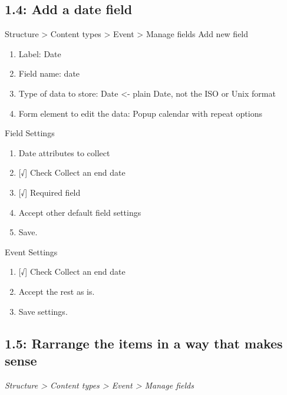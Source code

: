 \documentclass[letterpaper,10pt,english]{sphinxmanual}
\begin{document}
\subsection{1.4: Add a date field}
\label{event_calendar:add-a-date-field}
Structure \textgreater{} Content types \textgreater{} Event \textgreater{} Manage fields
Add new field
\begin{enumerate}
\item {} 
Label: Date

\item {} 
Field name: date

\item {} 
Type of data to store: Date \textless{}- plain Date, not the ISO or Unix format

\item {} 
Form element to edit the data: Popup calendar with repeat options

\end{enumerate}

Field Settings
\begin{enumerate}
\item {} 
Date attributes to collect

\item {} 
{[}√{]} Check Collect an end date

\item {} 
{[}√{]} Required field

\item {} 
Accept other default field settings

\item {} 
Save.

\end{enumerate}

Event Settings
\begin{enumerate}
\item {} 
{[}√{]} Check Collect an end date

\item {} 
Accept the rest as is.

\item {} 
Save settings.

\end{enumerate}


\subsection{1.5: Rarrange the items in a way that makes sense}
\label{event_calendar:rarrange-the-items-in-a-way-that-makes-sense}
\emph{Structure \textgreater{} Content types \textgreater{} Event \textgreater{} Manage fields}
\end{document}

